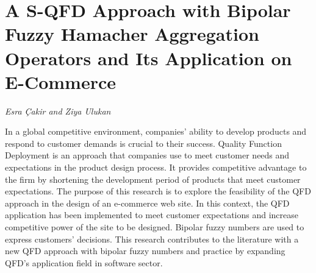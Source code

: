 \documentclass[../booklet.tex]{subfiles}
\begin{document}
\section[A S-QFD Approach with Bipolar Fuzzy Hamacher Aggregation Operators and Its Application on E-Commerce. {\it Esra Çakir and Ziya Ulukan}]{A S-QFD Approach with Bipolar Fuzzy Hamacher Aggregation Operators and Its Application on E-Commerce}
 

\begin{center}
  {\it Esra Çakir and Ziya Ulukan}
\end{center}

\vskip 0.8cm

In a global competitive environment, companies' ability to develop products and respond to customer demands is crucial to their success. Quality Function Deployment is an approach that companies use to meet customer needs and expectations in the product design process. It provides competitive advantage to the firm by shortening the development period of products that meet customer expectations. The purpose of this research is to explore the feasibility of the QFD approach in the design of an e-commerce web site. In this context, the QFD application has been implemented to meet customer expectations and increase competitive power of the site to be designed. Bipolar fuzzy numbers are used to express customers' decisions. This research contributes to the literature with a new QFD approach with bipolar fuzzy numbers and practice by expanding QFD's application field in software sector.
\end{document}
